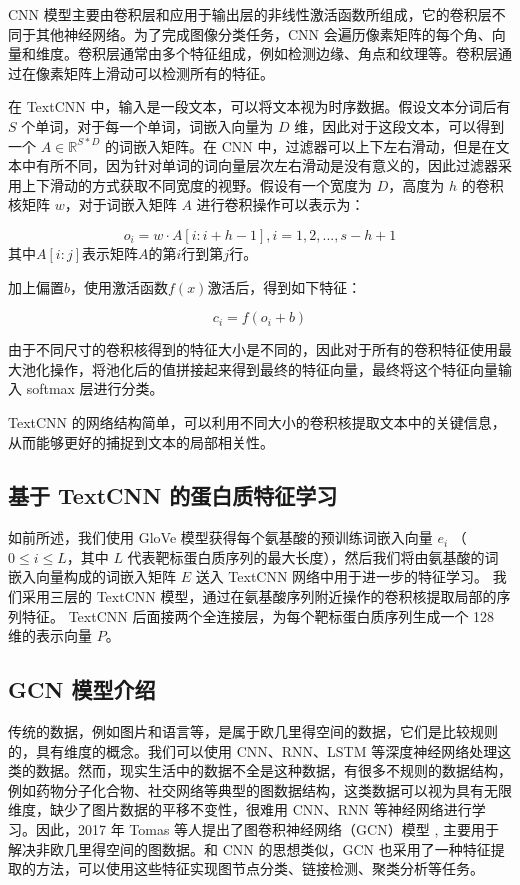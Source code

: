CNN 模型主要由卷积层和应用于输出层的非线性激活函数所组成，它的卷积层不同于其他神经网络。为了完成图像分类任务，CNN 会遍历像素矩阵的每个角、向量和维度。卷积层通常由多个特征组成，例如检测边缘、角点和纹理等。卷积层通过在像素矩阵上滑动可以检测所有的特征。

在 TextCNN 中，输入是一段文本，可以将文本视为时序数据。假设文本分词后有 $S$ 个单词，对于每一个单词，词嵌入向量为 $D$ 维，因此对于这段文本，可以得到一个 $A \in \mathbb{R}^{S*D}$ 的词嵌入矩阵。在 CNN 中，过滤器可以上下左右滑动，但是在文本中有所不同，因为针对单词的词向量层次左右滑动是没有意义的，因此过滤器采用上下滑动的方式获取不同宽度的视野。假设有一个宽度为 $D$，高度为 $h$ 的卷积核矩阵 $w$，对于词嵌入矩阵 $A$ 进行卷积操作可以表示为：

\begin{equation}
  o_i = w \cdot A[i:i+h-1], i = 1,2,...,s-h+1
\end{equation}
其中$A[i:j]$表示矩阵$A$的第$i$行到第$j$行。

加上偏置$b$，使用激活函数$f(x)$激活后，得到如下特征：

\begin{equation}
  c_i = f(o_i + b)
\end{equation}

由于不同尺寸的卷积核得到的特征大小是不同的，因此对于所有的卷积特征使用最大池化操作，将池化后的值拼接起来得到最终的特征向量，最终将这个特征向量输入 softmax 层进行分类。

TextCNN 的网络结构简单，可以利用不同大小的卷积核提取文本中的关键信息，从而能够更好的捕捉到文本的局部相关性。

\subsection{基于 TextCNN 的蛋白质特征学习}
如前所述，我们使用 GloVe 模型获得每个氨基酸的预训练词嵌入向量 $e_i$ （$0 \leq i \leq L$，其中 $L$ 代表靶标蛋白质序列的最大长度），然后我们将由氨基酸的词嵌入向量构成的词嵌入矩阵 $E$ 送入 TextCNN 网络中用于进一步的特征学习。 我们采用三层的 TextCNN 模型，通过在氨基酸序列附近操作的卷积核提取局部的序列特征。 TextCNN 后面接两个全连接层，为每个靶标蛋白质序列生成一个 128 维的表示向量 $P$。

\subsection{GCN 模型介绍}
传统的数据，例如图片和语言等，是属于欧几里得空间的数据，它们是比较规则的，具有维度的概念。我们可以使用 CNN、RNN、LSTM 等深度神经网络处理这类的数据。然而，现实生活中的数据不全是这种数据，有很多不规则的数据结构，例如药物分子化合物、社交网络等典型的图数据结构，这类数据可以视为具有无限维度，缺少了图片数据的平移不变性，很难用 CNN、RNN 等神经网络进行学习。因此，2017 年 Tomas 等人提出了图卷积神经网络（GCN）模型 \cite{kipf2016semi}, 主要用于解决非欧几里得空间的图数据。和 CNN 的思想类似，GCN 也采用了一种特征提取的方法，可以使用这些特征实现图节点分类、链接检测、聚类分析等任务。


